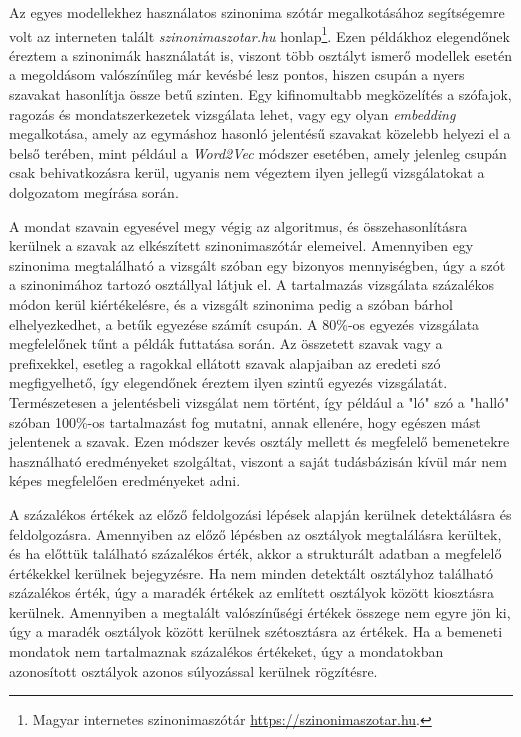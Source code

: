 Az egyes modellekhez használatos szinonima szótár megalkotásához segítségemre volt az interneten talált \textit{szinonimaszotar.hu} honlap\footnote{Magyar internetes szinonimaszótár \url{https://szinonimaszotar.hu}.}. Ezen példákhoz elegendőnek éreztem a szinonimák használatát is, viszont több osztályt ismerő modellek esetén a megoldásom valószínűleg már kevésbé lesz pontos, hiszen csupán a nyers szavakat hasonlítja össze betű szinten. Egy kifinomultabb megközelítés a szófajok, ragozás és mondatszerkezetek vizsgálata lehet, vagy egy olyan \textit{embedding} megalkotása, amely az egymáshoz hasonló jelentésű szavakat közelebb helyezi el a belső terében, mint például a \textit{Word2Vec} \cite{mikolov2013efficient} módszer esetében, amely jelenleg csupán csak behivatkozásra kerül, ugyanis nem végeztem ilyen jellegű vizsgálatokat a dolgozatom megírása során.

A mondat szavain egyesével megy végig az algoritmus, és összehasonlításra kerülnek a szavak az elkészített szinonimaszótár elemeivel. Amennyiben egy szinonima megtalálható a vizsgált szóban egy bizonyos mennyiségben, úgy a szót a szinonimához tartozó osztállyal látjuk el. A tartalmazás vizsgálata százalékos módon kerül kiértékelésre, és a vizsgált szinonima pedig a szóban bárhol elhelyezkedhet, a betűk egyezése számít csupán. A 80\%-os egyezés vizsgálata megfelelőnek tűnt a példák futtatása során. Az összetett szavak vagy a prefixekkel, esetleg a ragokkal ellátott szavak alapjaiban az eredeti szó megfigyelhető, így elegendőnek éreztem ilyen szintű egyezés vizsgálatát. Természetesen a jelentésbeli vizsgálat nem történt, így például a "ló" szó a "halló" szóban 100\%-os tartalmazást fog mutatni, annak ellenére, hogy egészen mást jelentenek a szavak.
Ezen módszer kevés osztály mellett és megfelelő bemenetekre használható eredményeket szolgáltat, viszont a saját tudásbázisán kívül már nem képes megfelelően eredményeket adni.

A százalékos értékek az előző feldolgozási lépések alapján kerülnek detektálásra és feldolgozásra. Amennyiben az előző lépésben az osztályok megtalálásra kerültek, és ha előttük található százalékos érték, akkor a strukturált adatban a megfelelő értékekkel kerülnek bejegyzésre. Ha nem minden detektált osztályhoz található százalékos érték, úgy a maradék értékek az említett osztályok között kiosztásra kerülnek.
Amennyiben a megtalált valószínűségi értékek összege nem egyre jön ki, úgy a maradék osztályok között kerülnek szétosztásra az értékek. Ha a bemeneti mondatok nem tartalmaznak százalékos értékeket, úgy a mondatokban azonosított osztályok azonos súlyozással kerülnek rögzítésre.

